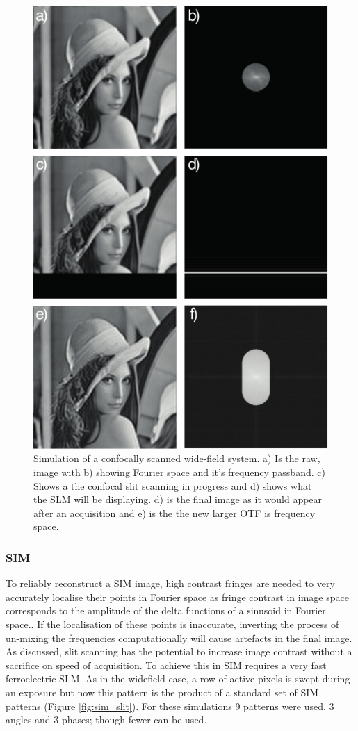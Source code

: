 \begin{figure}
  \centering
  \includegraphics{widefield_slit}
  \caption{Simulation of a confocally scanned wide-field system. a) Is the raw, image with b) showing Fourier space and it's frequency passband.
  c) Shows a the confocal slit scanning in progress and d) shows what the SLM will be displaying.
  d) is the final image as it would appear after an acquisition and e) is the the new larger OTF is frequency space.
  }
  \label{fig:widefield_slit}
\end{figure}

\subsubsection{SIM}

To reliably reconstruct a SIM image, high contrast fringes are needed to very accurately localise their points in Fourier space as fringe contrast in image space corresponds to the amplitude of the delta functions of a sinusoid in Fourier space..
If the localisation of these points is inaccurate, inverting the process of un-mixing the frequencies computationally will cause artefacts in the final image.
As discussed, slit scanning has the potential to increase image contrast without a sacrifice on speed of acquisition.
To achieve this in SIM requires a very fast ferroelectric SLM.
As in the widefield case, a row of active pixels is swept during an exposure but now this pattern is the product of a standard set of SIM patterns (Figure \ref{fig:sim_slit}).
For these simulations 9 patterns were used, 3 angles and 3 phases; though fewer can be used.

